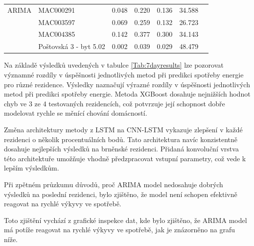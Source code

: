\documentclass[FM,BP,fonts]{tulthesis}
\begin{document}
\begin{table}[!ht]
\begin{tabular}{lllllll}
		ARIMA           & MAC000291          & 0.048            & 0.220             & 0.136        &  34.588            \\ 
		~               & MAC003597          & 0.069            & 0.259             & 0.132            & 26.723             \\  
		~               & MAC004385          & 0.142            & 0.377             & 0.300           & 34.143             \\ 
		~               & Poštovská 3 - byt 5.02  & 0.002           & 0.039             & 0.029           & 48.479 \\   
		
		
	\end{tabular}
\end{table}




Na základě výsledků uvedených v tabulce \ref{Tab:7dayresults} lze pozorovat významné rozdíly v úspěšnosti jednotlivých metod při predikci spotřeby energie pro různé rezidence. Výsledky naznačují výrazné rozdíly v úspěšnosti jednotlivých metod při predikci spotřeby energie. Metoda XGBoost dosahuje nejnižších hodnot chyb ve 3 ze 4 testovaných rezidencích, což potvrzuje její schopnost dobře modelovat rychle se měnící chování domácností.

Změna architektury metody z LSTM na CNN-LSTM vykazuje zlepšení v každé rezidenci o několik procentuálních bodů. Tato architektura navíc konzistentně dosahuje nejlepších výsledků na brněnské rezidenci. Přidaná konvoluční vrstva této architektuře umožňuje vhodně předzpracovat vstupní parametry, což vede k lepším výsledkům.

Při zpětném průzkumu důvodů, proč ARIMA model nedosahuje dobrých výsledků na poslední rezidenci, bylo zjištěno, že model není schopen efektivně reagovat na rychlé výkyvy ve spotřebě. 

Toto zjištění vychází z grafické inspekce dat, kde bylo zjištěno, že ARIMA model má potíže reagovat na rychlé výkyvy ve spotřebě, jak je znázorněno na grafu \label{spike_analysis} níže.
\end{document}
